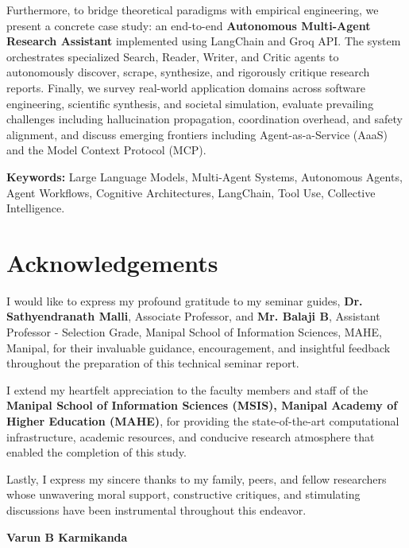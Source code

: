 \documentclass[12pt,a4paper]{report}
\begin{document}
Furthermore, to bridge theoretical paradigms with empirical engineering, we present a concrete case study: an end-to-end \textbf{Autonomous Multi-Agent Research Assistant} implemented using LangChain and Groq API. The system orchestrates specialized Search, Reader, Writer, and Critic agents to autonomously discover, scrape, synthesize, and rigorously critique research reports. Finally, we survey real-world application domains across software engineering, scientific synthesis, and societal simulation, evaluate prevailing challenges including hallucination propagation, coordination overhead, and safety alignment, and discuss emerging frontiers including Agent-as-a-Service (AaaS) and the Model Context Protocol (MCP).

\vspace{0.8cm}
\noindent \textbf{Keywords:} Large Language Models, Multi-Agent Systems, Autonomous Agents, Agent Workflows, Cognitive Architectures, LangChain, Tool Use, Collective Intelligence.

\newpage
\chapter*{Acknowledgements}

I would like to express my profound gratitude to my seminar guides, \textbf{Dr. Sathyendranath Malli}, Associate Professor, and \textbf{Mr. Balaji B}, Assistant Professor - Selection Grade, Manipal School of Information Sciences, MAHE, Manipal, for their invaluable guidance, encouragement, and insightful feedback throughout the preparation of this technical seminar report.

I extend my heartfelt appreciation to the faculty members and staff of the \textbf{Manipal School of Information Sciences (MSIS), Manipal Academy of Higher Education (MAHE)}, for providing the state-of-the-art computational infrastructure, academic resources, and conducive research atmosphere that enabled the completion of this study.

Lastly, I express my sincere thanks to my family, peers, and fellow researchers whose unwavering moral support, constructive critiques, and stimulating discussions have been instrumental throughout this endeavor.

\vspace{1.5cm}
\noindent \textbf{Varun B Karmikanda}
\end{document}
